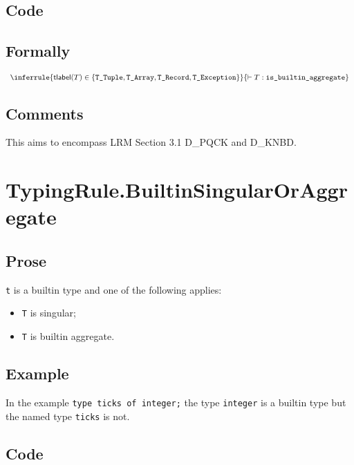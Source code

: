 \documentclass{book}
\newcommand\typelabel[0]{\textsf{tlabel}} %
\newcommand\isbuiltinaggregate[0]{\texttt{is\_builtin\_aggregate}}
\begin{document}
    \subsection{Code}

\begin{formal}
    \subsection{Formally}
\[
\begin{array}{c}
\inferrule{\typelabel(T) \in \{\TTuple, \TArray, \TRecord, \TException\}}
{\entails T : \isbuiltinaggregate} \\
\end{array}
\]
\end{formal}

    \subsection{Comments}
    This aims to encompass LRM Section 3.1 D\_PQCK and D\_KNBD.

\section{TypingRule.BuiltinSingularOrAggregate \label{sec:TypingRule.BuiltinSingularOrAggregate}}

    \subsection{Prose}
    \texttt{t} is a builtin type and one of the following applies:
    \begin{itemize}
    \item \texttt{T} is singular;
    \item \texttt{T} is builtin aggregate.
    \end{itemize}
    
    \subsection{Example}
In the example \texttt{type ticks of integer;} the type \texttt{integer} is a builtin type but the named type \texttt{ticks} is not.

    \subsection{Code}
\end{document}
